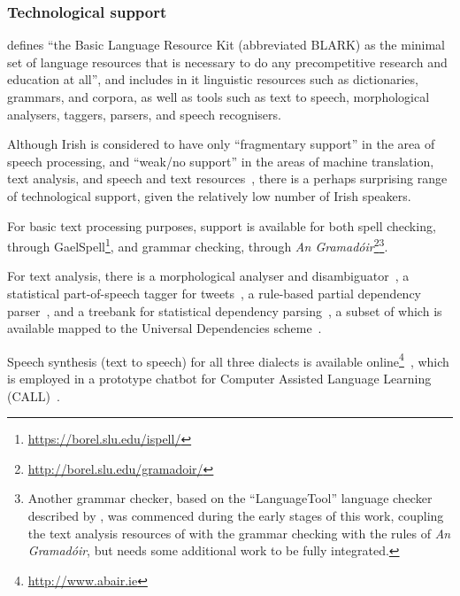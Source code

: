 \subsubsection{Technological support}

\citet[s. 5.1]{krauwer2003basic} defines ``the  Basic  Language  Resource  Kit  
(abbreviated  BLARK)  as  the  minimal  set  of  language  
resources that is necessary to do any precompetitive 
research and education at all'', and includes in it linguistic resources such as dictionaries, 
grammars, and corpora, as well as tools such as text to speech, morphological analysers, taggers,
parsers, and speech recognisers.

Although Irish is considered to have only ``fragmentary support'' in the area of speech processing,
and ``weak/no support'' in the areas of machine translation, text analysis, and speech and text
resources~\citep[pp. 77--78]{LWP-Irish}, there is a perhaps surprising range of technological support,
given the relatively low number of Irish speakers.

For basic text processing purposes, support is available for both spell 
checking, through GaelSpell\footnote{\href{https://borel.slu.edu/ispell/}{https://borel.slu.edu/ispell/}}, and 
grammar checking, through \textit{An Gramad\'oir}\footnote{\href{http://borel.slu.edu/gramadoir/}{http://borel.slu.edu/gramadoir/}}\footnote{Another
grammar checker, based on the ``LanguageTool'' language checker described by \citet{naber2003rule}, was
commenced during the early stages of this work, coupling the text analysis resources of
\citet{elain09} with the grammar checking with the rules of \textit{An Gramad\'oir}, but needs
some additional work to be fully integrated.}.

For text analysis, there is a morphological analyser and disambiguator~\citep{elain09},
a statistical part-of-speech tagger for tweets~\citep{lynn2015minority}, 
a rule-based partial dependency parser~\citep{UDHONNCHADHA10.824}, and a
treebank for statistical dependency parsing~\citep{lynn16treebank}, a subset of which
is available mapped to the Universal Dependencies scheme~\citep{lynn2016universal}.

Speech synthesis (text to speech) for all three dialects is available 
online\footnote{\href{http://www.abair.ie}{http://www.abair.ie}}~\citep{chasaide2017abair}, 
which is employed in a prototype chatbot for Computer Assisted Language Learning
(CALL)~\citep{nichiarain2016chatbot}.

